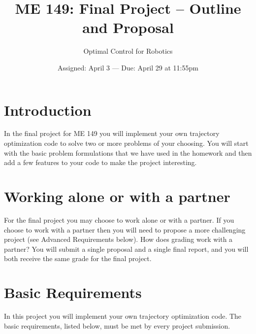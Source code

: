 

\title{ME 149:  Final Project  --  Outline and Proposal}
\date{Assigned: April 3  ---  Due: April 29 at 11:55pm}
\author{Optimal Control for Robotics}

\maketitle


\section*{Introduction}

In the final project for ME 149 you will
implement your own trajectory optimization code
to solve two or more problems of your choosing.
You will start with the basic problem formulations that we have used in the homework
and then add a few features to your code to make the project interesting.


\section*{Working alone or with a partner}

For the final project you may choose to work alone or with a partner.
If you choose to work with a partner then you will need to propose a more
challenging project (see Advanced Requirements below).
How does grading work with a partner?
You will submit a single proposal and a single final report,
and you will both receive the same grade for the final project.


\section*{Basic Requirements}

In this project you will implement your own trajectory optimization code.
The basic requirements, listed below, must be met by every project submission.

